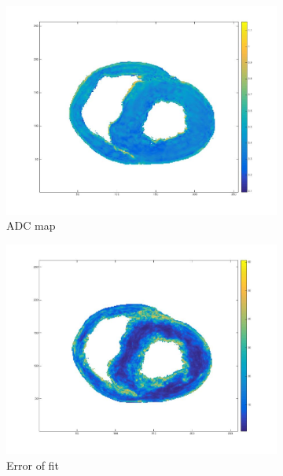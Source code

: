 \begin{figure}[h!]
    \begin{subfigure}{.31\textwidth}
        \includegraphics[width=\textwidth]{figures/pig25_adc_30}
        \caption{ADC map}
        \label{fig:pig25_adc}
    \end{subfigure}
    \begin{subfigure}{.31\textwidth}
        \includegraphics[width=\textwidth]{figures/pig25_err_30}
        \caption{Error of fit}
        \label{fig:pig25_err}
    \end{subfigure}
    \begin{subfigure}{.31\textwidth}

\end{subfigure}
\end{figure}
